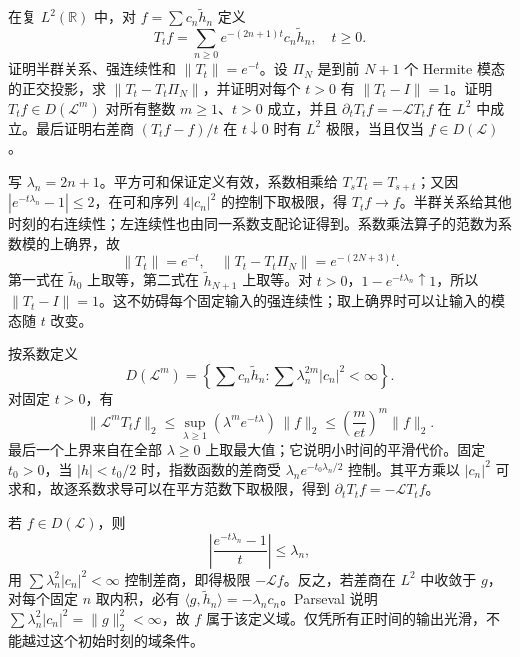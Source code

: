 \begin{exercise}\label{b2:ex:B2-oscillator-semigroup}
在复 \(L^2(\mathbb R)\) 中，对 \(f=\sum c_n\widetilde h_n\) 定义
\[
 T_tf=\sum_{n\ge0}e^{-(2n+1)t}c_n\widetilde h_n,
 \quad t\ge0.
\]
证明半群关系、强连续性和 \(\|T_t\|=e^{-t}\)。设 \(\Pi_N\) 是到前 \(N+1\) 个 Hermite 模态的正交投影，求 \(\|T_t-T_t\Pi_N\|\)，并证明对每个 \(t>0\) 有 \(\|T_t-I\|=1\)。证明 \(T_tf\in D(\mathcal L^m)\) 对所有整数 \(m\ge1\)、\(t>0\) 成立，并且 \(\partial_tT_tf=-\mathcal LT_tf\) 在 \(L^2\) 中成立。最后证明右差商 \((T_tf-f)/t\) 在 \(t\downarrow0\) 时有 \(L^2\) 极限，当且仅当 \(f\in D(\mathcal L)\)。
\end{exercise}
\begin{solution}
写 \(\lambda_n=2n+1\)。平方可和保证定义有效，系数相乘给 \(T_sT_t=T_{s+t}\)；又因 \(|e^{-t\lambda_n}-1|\le2\)，在可和序列 \(4|c_n|^2\) 的控制下取极限，得 \(T_tf\to f\)。半群关系给其他时刻的右连续性；左连续性也由同一系数支配论证得到。系数乘法算子的范数为系数模的上确界，故
\[
 \|T_t\|=e^{-t},\quad
 \|T_t-T_t\Pi_N\|=e^{-(2N+3)t}.
\]
第一式在 \(\widetilde h_0\) 上取等，第二式在 \(\widetilde h_{N+1}\) 上取等。对 \(t>0\)，\(1-e^{-t\lambda_n}\uparrow1\)，所以 \(\|T_t-I\|=1\)。这不妨碍每个固定输入的强连续性；取上确界时可以让输入的模态随 \(t\) 改变。

按系数定义
\[
 D(\mathcal L^m)=\left\{\sum c_n\widetilde h_n:
                 \sum\lambda_n^{2m}|c_n|^2<\infty\right\}.
\]
对固定 \(t>0\)，有
\[
 \|\mathcal L^mT_tf\|_2
 \le\sup_{\lambda\ge1}(\lambda^me^{-t\lambda})\,\|f\|_2
 \le\left(\frac m{et}\right)^m\|f\|_2.
\]
最后一个上界来自在全部 \(\lambda\ge0\) 上取最大值；它说明小时间的平滑代价。固定 \(t_0>0\)，当 \(|h|<t_0/2\) 时，指数函数的差商受 \(\lambda_ne^{-t_0\lambda_n/2}\) 控制。其平方乘以 \(|c_n|^2\) 可求和，故逐系数求导可以在平方范数下取极限，得到 \(\partial_tT_tf=-\mathcal LT_tf\)。

若 \(f\in D(\mathcal L)\)，则
\[
 \left|\frac{e^{-t\lambda_n}-1}{t}\right|\le\lambda_n,
\]
用 \(\sum\lambda_n^2|c_n|^2<\infty\) 控制差商，即得极限 \(-\mathcal Lf\)。反之，若差商在 \(L^2\) 中收敛于 \(g\)，对每个固定 \(n\) 取内积，必有 \(\langle g,\widetilde h_n\rangle=-\lambda_nc_n\)。Parseval 说明 \(\sum\lambda_n^2|c_n|^2=\|g\|_2^2<\infty\)，故 \(f\) 属于该定义域。仅凭所有正时间的输出光滑，不能越过这个初始时刻的域条件。
\end{solution}

